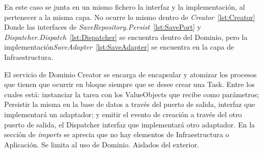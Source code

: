 En este caso se junta en un mismo fichero la interfaz y la implementación, al pertenecer a la misma capa.
No ocurre lo mismo dentro de \textit{Creator}~\cref{lst:Creator} Donde las interfaces de \textit{SaveRepository.Persist}~\cref{lst:SavePort} y \textit{Dispatcher.Dispatch}~\cref{lst:Dispatcher} se encuentra dentro del Dominio, pero la implementación\textit{SaveAdapter}~\cref{lst:SaveAdapter} se encuentra en la capa de Infraestructura.

El servicio de Dominio Creator se encarga de encapsular y atomizar los procesos que tienen que ocurrir en bloque siempre que se desee crear una Task.
Entre los cuales está: instanciar la tarea con los ValueObjects que recibe como parámetros;
Persistir la misma en la base de datos a través del puerto de salida, interfaz que implementará un adaptador;
y emitir el evento de creación a través del otro puerto de salida, el Dispatcher interfaz que implementará otro adaptador.
En la sección de \textit{imports} se aprecia que no hay elementos de Infraestructura o Aplicación.
Se limita al uso de Dominio.
Aislados del exterior.








